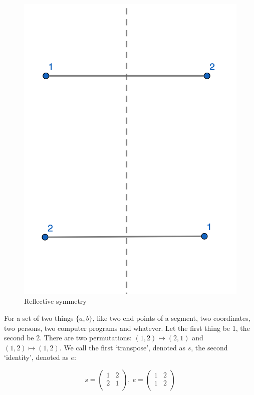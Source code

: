 \documentclass[b5paper]{article}
\begin{document}
\begin{figure}[htbp]
  \centering
  \includegraphics[scale=0.8]{img/reflection.png}
  \caption{Reflective symmetry}
  \label{fig:reflection}
\end{figure}

For a set of two things $\{a, b\}$, like two end points of a segment, two coordinates, two persons, two computer programs and whatever. Let the first thing be 1, the second be 2. There are two permutations: $(1, 2) \mapsto (2, 1)$ and $(1, 2) \mapsto (1, 2)$. We call the first `transpose', denoted as $s$, the second `identity', denoted as $e$:

\[ s = \begin{pmatrix}
1 & 2 \\
2 & 1 \\
\end{pmatrix}
,\
e = \begin{pmatrix}
1 & 2 \\
1 & 2 \\
\end{pmatrix}
\]
\end{document}
